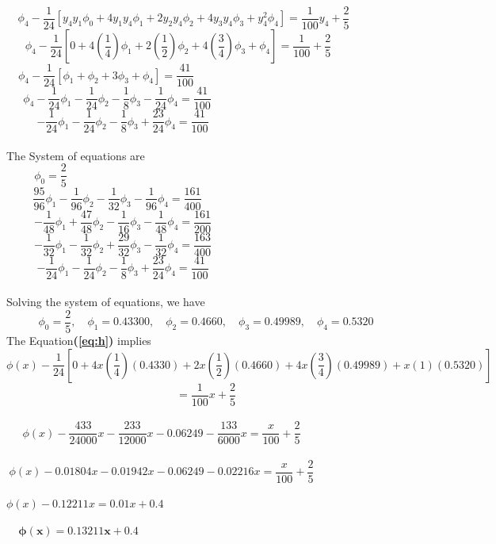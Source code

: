 \documentclass[a4paper,12pt]{report}
\newcommand{\spn}[1]{\\[#1cm]}
\newcommand{\refn}[1]{\textbf{(\ref{#1})}}
\begin{document}
	$$
	\phi_4 - \frac{1}{24} \left[y_4y_1 \phi_0 + 4y_1y_4\phi_1 + 2y_2y_4\phi_2 + 4y_3y_4\phi_3 + y_4^2\phi_4\right]	= \frac{1}{100}y_4 + \frac{2}{5}\qquad\qquad
	$$
	$$
	\phi_4 - \frac{1}{24} \left[0 + 4\left(\frac{1}{4}\right)\phi_1 + 2\left(\frac{1}{2}\right)\phi_2 + 4\left(\frac{3}{4}\right)\phi_3 + \phi_4\right] = \frac{1}{100}+\frac{2}{5}\qquad\qquad\quad
	$$
	$$
	\phi_4 - \frac{1}{24} \left[\phi_1 +\phi_2 + 3\phi_3 + \phi_4\right] = \frac{41}{100}\qquad\qquad\qquad\qquad\qquad\qquad\qquad\qquad\qquad
	$$
	$$
	\phi_4 - \frac{1}{24}\phi_1 -\frac{1}{24}\phi_2 - \frac{1}{8}\phi_3 - \frac{1}{24}\phi_4 = \frac{41}{100} \qquad\qquad\qquad\qquad\qquad\qquad\quad\qquad\quad
	$$
	\begin{equation}
		-\frac{1}{24}\phi_1 -\frac{1}{24}\phi_2 - \frac{1}{8}\phi_3 + \frac{23}{24}\phi_4 = \frac{41}{100} \qquad\qquad\qquad\qquad\qquad\qquad\quad\qquad \tag{v}
	\end{equation}
	\spn{-.2}The System of equations are
	\begin{equation}
		\phi_0 = \frac{2}{5}\qquad\qquad\qquad\qquad\qquad\qquad\qquad\qquad\qquad\qquad\qquad\qquad\qquad\quad\quad \tag{i}
	\end{equation}
	\begin{equation}
		\frac{95}{96}\phi_1 -\frac{1}{96}\phi_2 - \frac{1}{32}\phi_3 - \frac{1}{96}\phi_4 = \frac{161}{400} \qquad\qquad\qquad\qquad\qquad\qquad\quad\qquad\quad \tag{ii}
	\end{equation}
	\begin{equation}
		-\frac{1}{48}\phi_1 +\frac{47}{48}\phi_2 - \frac{1}{16}\phi_3 - \frac{1}{48}\phi_4 = \frac{161}{200} \qquad\qquad\qquad\qquad\qquad\qquad\quad\qquad \tag{iii}
	\end{equation}
	\begin{equation}
		-\frac{1}{32}\phi_1 -\frac{1}{32}\phi_2 + \frac{29}{32}\phi_3 - \frac{1}{32}\phi_4 = \frac{163}{400} \qquad\qquad\qquad\qquad\qquad\qquad\quad\qquad \tag{iv}
	\end{equation}
	\begin{equation}
		-\frac{1}{24}\phi_1 -\frac{1}{24}\phi_2 - \frac{1}{8}\phi_3 + \frac{23}{24}\phi_4 = \frac{41}{100} \qquad\qquad\qquad\qquad\qquad\qquad\quad\qquad \tag{v}
	\end{equation}
	\spn{-.5}Solving the system of equations, we have
	$$
		\phi_0 = \frac{2}{5}, \quad \phi_1 = 0.43300, \quad \phi_2=0.4660, \quad \phi_3 = 0.49989, \quad \phi_4=0.5320
	$$
	The Equation\refn{eq:h} implies
	$$
		\phi(x) - \frac{1}{24}\left[0 + 4x\left(\frac{1}{4}\right)\left(0.4330\right) + 2x\left(\frac{1}{2}\right)\left(0.4660\right)+4x\left(\frac{3}{4}\right)\left(0.49989\right) + x(1)(0.5320)\right]
	$$
	$$
		= \frac{1}{100}x +\frac{2}{5}
	$$\spn{-1.1}
	$$
		\phi(x) - \frac{433}{24000}x - \frac{233}{12000}x - 0.06249 - \frac{133}{6000}x = \frac{x}{100} + \frac{2}{5}\qquad\qquad\qquad\qquad
	$$
	\spn{-1.2}
	$$
		\phi(x) - 0.01804x - 0.01942x - 0.06249 - 0.02216x = \frac{x}{100} + \frac{2}{5}\qquad\qquad\qquad\qquad
	$$
	\spn{-1.2}
	$$
		\phi(x) - 0.12211x = 0.01x + 0.4\qquad\quad\qquad\qquad\qquad\qquad\qquad\qquad\qquad\qquad\qquad \qquad
	$$
	\spn{-1.2}
	$$
		\mathbf{\phi(x) = 0.13211x + 0.4}\qquad\quad\qquad\qquad\qquad\qquad\qquad\qquad\qquad\qquad\qquad \qquad
	$$
	
\end{document}
